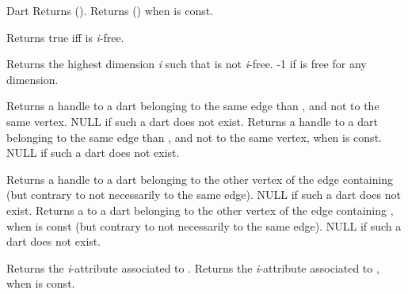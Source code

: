 \begin{ccRefConcept}{Dart}
         {Returns \betaiinv{}().
          }
\ccGlue
{}
         {Returns \betaiinv{}() when  is const.
          }

         {Returns true iff  is \emph{i}-free.
          }

         {Returns the highest dimension \emph{i} such that  is not \emph{i}-free.
          -1 if  is free for any dimension.}

         {Returns a handle to a dart belonging to the same edge 
          than , and not to the same vertex.
          NULL if such a dart does not exist.}
\ccGlue
{}
         {Returns a handle to a dart belonging to the same edge 
          than , and not to the same vertex, when  is const.
          NULL if such a dart does not exist.}

         {Returns a handle to a dart belonging to the other vertex of
          the edge containing  (but contrary to  not 
          necessarily to the same edge). NULL if such a dart does not exist.}
\ccGlue
{}
         {Returns a  to a dart belonging to the other vertex of
          the edge containing , when  is const (but contrary to
           not necessarily to the same edge). 
          NULL if such a dart does not exist.}

         {Returns the \emph{i}-attribute associated to .
           }
\ccGlue
{}
         {Returns the \emph{i}-attribute associated to ,
           when   is const.
           }

\ccHasModels
{}

\end{ccRefConcept}
\ccRefPageEnd

